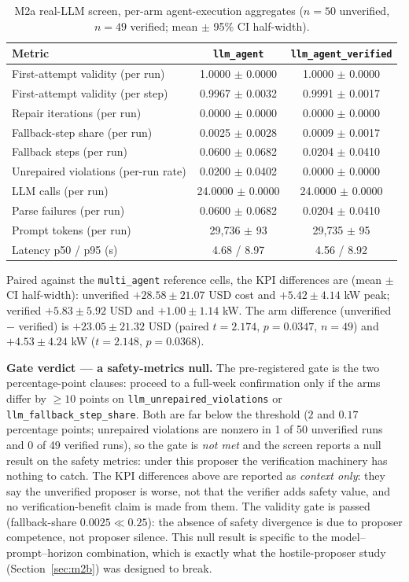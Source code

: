 \documentclass[11pt,a4paper]{article}
\newcommand{\agent}[1]{\texttt{#1}}
\begin{document}
\begin{table}[htbp]
\centering
\caption{M2a real-LLM screen, per-arm agent-execution aggregates ($n{=}50$ unverified, $n{=}49$ verified; mean $\pm$ 95\% CI half-width).}
\label{tab:m2a-exec}
\begin{tabular}{lcc}
\toprule
Metric & \agent{llm\_agent} & \agent{llm\_agent\_verified} \\
\midrule
First-attempt validity (per run) & 1.0000 $\pm$ 0.0000 & 1.0000 $\pm$ 0.0000 \\
First-attempt validity (per step) & 0.9967 $\pm$ 0.0032 & 0.9991 $\pm$ 0.0017 \\
Repair iterations (per run) & 0.0000 $\pm$ 0.0000 & 0.0000 $\pm$ 0.0000 \\
Fallback-step share (per run) & 0.0025 $\pm$ 0.0028 & 0.0009 $\pm$ 0.0017 \\
Fallback steps (per run) & 0.0600 $\pm$ 0.0682 & 0.0204 $\pm$ 0.0410 \\
Unrepaired violations (per-run rate) & 0.0200 $\pm$ 0.0402 & 0.0000 $\pm$ 0.0000 \\
LLM calls (per run) & 24.0000 $\pm$ 0.0000 & 24.0000 $\pm$ 0.0000 \\
Parse failures (per run) & 0.0600 $\pm$ 0.0682 & 0.0204 $\pm$ 0.0410 \\
Prompt tokens (per run) & 29{,}736 $\pm$ 93 & 29{,}735 $\pm$ 95 \\
Latency p50 / p95 (s) & 4.68 / 8.97 & 4.56 / 8.92 \\
\bottomrule
\end{tabular}
\end{table}

Paired against the \agent{multi\_agent} reference cells, the KPI differences
are (mean $\pm$ CI half-width): unverified $+28.58 \pm 21.07$ USD cost and
$+5.42 \pm 4.14$ kW peak; verified $+5.83 \pm 5.92$ USD and $+1.00 \pm 1.14$ kW.
The arm difference (unverified $-$ verified) is $+23.05 \pm 21.32$ USD
(paired $t{=}2.174$, $p{=}0.0347$, $n{=}49$) and $+4.53 \pm 4.24$ kW
($t{=}2.148$, $p{=}0.0368$).

\textbf{Gate verdict --- a safety-metrics null.} The pre-registered gate is
the two percentage-point clauses: proceed to a full-week confirmation only if
the arms differ by $\geq 10$ points on \texttt{llm\_unrepaired\_violations} or
\texttt{llm\_fallback\_step\_share}. Both are far below the threshold
($2$ and $0.17$ percentage points; unrepaired violations are nonzero in 1 of 50
unverified runs and 0 of 49 verified runs), so the gate is \emph{not met} and
the screen reports a null result on the safety metrics: under this proposer the
verification machinery has nothing to catch. The KPI differences above are
reported as \emph{context only}: they say the unverified proposer is worse, not
that the verifier adds safety value, and no verification-benefit claim is made
from them. The validity gate is passed (fallback-share $0.0025 \ll 0.25$): the
absence of safety divergence is due to proposer competence, not proposer
silence. This null result is specific to the model--prompt--horizon
combination, which is exactly what the hostile-proposer study
(Section~\ref{sec:m2b}) was designed to break.
\end{document}
